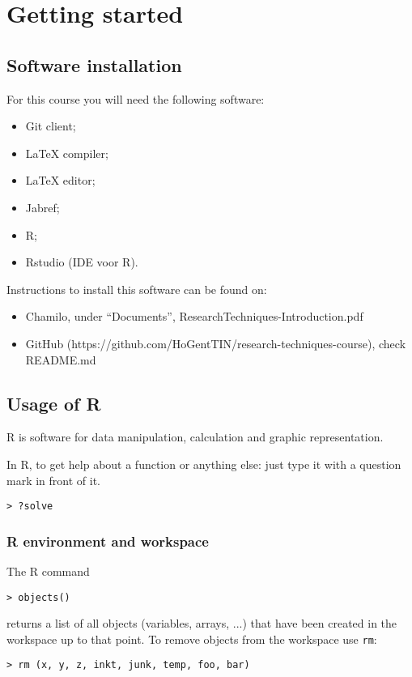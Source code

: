 \chapter{Getting started}
\label{ch:getting-started}

\section{Software installation}
\label{sec:installatie-software}

For this course you will need the following software:

\begin{itemize}
  \item Git client;
  \item \LaTeX{} compiler;
  \item \LaTeX{} editor;
  \item Jabref;
  \item R;
  \item Rstudio (IDE voor R).
\end{itemize}

Instructions to install this software can be found on:
\begin{itemize}
    \item Chamilo, under ``Documents'', ResearchTechniques-Introduction.pdf
    \item GitHub (https://github.com/HoGentTIN/research-techniques-course), check README.md
\end{itemize}

\section{Usage of R}

R is software for data manipulation, calculation and graphic representation.

In R, to get help about a function or anything else: just type it with a question mark in front of it.
\begin{lstlisting}
> ?solve
\end{lstlisting}

\subsection{R environment and workspace}

The R command
\begin{lstlisting}
> objects()
\end{lstlisting}
returns a list of all objects (variables, arrays, ...) that have been created in the workspace up to that point.
To remove objects from the workspace use \texttt{rm}:
\begin{lstlisting}
> rm (x, y, z, inkt, junk, temp, foo, bar)
\end{lstlisting}

